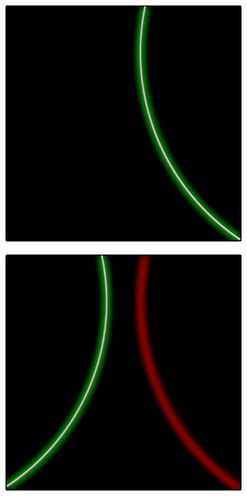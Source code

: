 \begin{figure}[t]
\begin{subfigure}{.24\textwidth}
        \caption{}
    \end{subfigure}
    \begin{subfigure}{.24\textwidth}
        \centering
        \includegraphics[scale=.065]{figures/Coaxing/SingleLine1.png}
        \caption{}
    \end{subfigure}
    \begin{subfigure}{.24\textwidth}
        \centering
        \includegraphics[scale=.065]{figures/Coaxing/SingleLine2.png}

\end{subfigure}
\end{figure}
